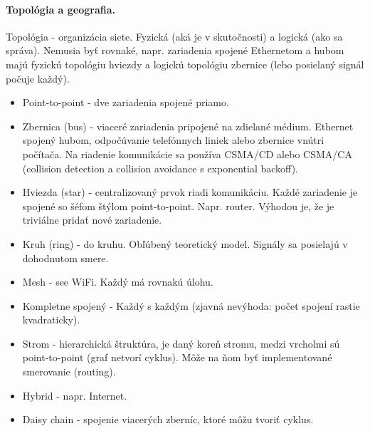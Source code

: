 \paragraph{Topológia a geografia.} 
Topológia - organizácia siete. Fyzická (aká je v skutočnosti) a logická (ako sa správa). Nemusia byť rovnaké, napr. zariadenia spojené Ethernetom a hubom majú fyzickú topológiu hviezdy a logickú topológiu zbernice (lebo posielaný signál počuje každý).  
\begin{itemize}
\item Point-to-point - dve zariadenia spojené priamo.         
\item Zbernica (bus) - viaceré zariadenia pripojené na zdielané médium. Ethernet spojený hubom, odpočúvanie telefónnych liniek alebo zbernice vnútri počítača. Na riadenie komunikácie sa používa CSMA/CD alebo CSMA/CA (collision detection a collision avoidance s exponential backoff).
\item Hviezda (star) - centralizovaný prvok riadi komunikáciu. Každé zariadenie je spojené so šéfom štýlom point-to-point. Napr. router.  Výhodou je, že je triviálne pridať nové zariadenie. 
\item Kruh (ring) - do kruhu. Obľúbený teoretický model. Signály sa posielajú v dohodnutom smere. 
\item Mesh - see WiFi. Každý má rovnakú úlohu. 
\item Kompletne spojený - Každý s každým (zjavná nevýhoda: počet spojení rastie kvadraticky). 
\item Strom - hierarchická štruktúra, je daný koreň stromu, medzi vrcholmi sú point-to-point (graf netvorí cyklus). Môže na ňom byť implementované smerovanie (routing). 
\item Hybrid - napr. Internet. 
\item Daisy chain - spojenie viacerých zberníc, ktoré môžu tvoriť cyklus. 
\end{itemize}

